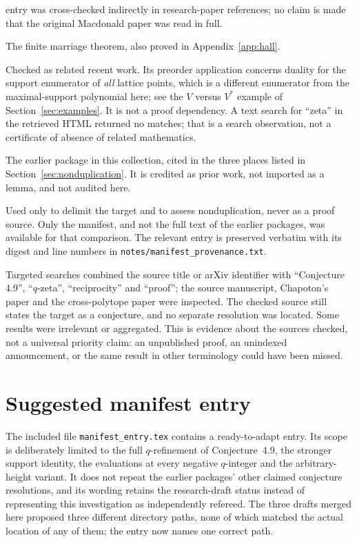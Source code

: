 \documentclass[11pt]{article}
\numberwithin{equation}{section}
\theoremstyle{definition}
\theoremstyle{remark}
\begin{document}
\begin{description}[style=nextline,leftmargin=1.2em,labelwidth=0pt,labelindent=0pt,font=\normalfont\bfseries]
entry was cross-checked indirectly in research-paper references; no claim is
made that the original Macdonald paper was read in full.
\item[Hall, JLMS 10 (1935), 26--30.]
The finite marriage theorem, also proved in Appendix~\ref{app:hall}.
\item[Dai--Hou--Liu--Thawinrak--Wang, arXiv:2608.16037v2, 27 August 2026.]
Checked as related recent work. Its preorder application concerns duality for
the support enumerator of \emph{all} lattice points, which is a different
enumerator from the maximal-support polynomial here; see the $V$ versus $V^*$
example of Section~\ref{sec:examples}. It is not a proof dependency. A text
search for ``zeta'' in the retrieved HTML returned no matches; that is a
search observation, not a certificate of absence of related mathematics.
\item[\nolinkurl{enumerative-combinatorics/preorder-polytope-reciprocity}.]
The earlier package \cite{PriorReciprocity} in this collection, cited in the
three places listed in Section~\ref{sec:nonduplication}. It is credited as
prior work, not imported as a lemma, and not audited here.
\item[User-supplied \texttt{manifest.tex}, 20 September 2026.]
Used only to delimit the target and to assess nonduplication, never as a proof
source. Only the manifest, and not the full text of the earlier packages, was
available for that comparison. The relevant entry is preserved verbatim with
its digest and line numbers in \texttt{notes/manifest\_provenance.txt}.
\item[Status searches, 20 September 2026.]
Targeted searches combined the source title or arXiv identifier with
``Conjecture 4.9'', ``$q$-zeta'', ``reciprocity'' and ``proof''; the source
manuscript, Chapoton's paper and the cross-polytope paper were inspected. The
checked source still states the target as a conjecture, and no separate
resolution was located. Some results were irrelevant or aggregated. This is
evidence about the sources checked, not a universal priority claim: an
unpublished proof, an unindexed announcement, or the same result in other
terminology could have been missed.
\end{description}

\section{Suggested manifest entry}
\label{app:manifest}

The included file \texttt{manifest\_entry.tex} contains a ready-to-adapt
entry. Its scope is deliberately limited to the full $q$-refinement of
Conjecture~4.9, the stronger support identity, the evaluations at every
negative $q$-integer and the arbitrary-height variant. It does not repeat the
earlier packages' other claimed conjecture resolutions, and its wording
retains the research-draft status instead of representing this investigation
as independently refereed. The three drafts merged here proposed three
different directory paths, none of which matched the actual location of any of
them; the entry now names one correct path.
\end{document}
